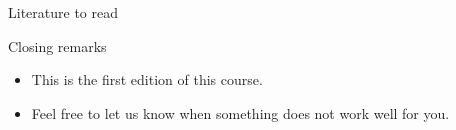\documentclass{beamer}
\begin{document}
\begin{frame}{Literature to read}
\nocite{*}
\AtNextBibliography{\footnotesize}
\printbibliography
\end{frame}

\begin{frame}{Closing remarks}
    \begin{itemize}
        \item This is the first edition of this course.
        \item Feel free to let us know when something does not work well for you.
    \end{itemize}
    \end{frame}


\end{document}

